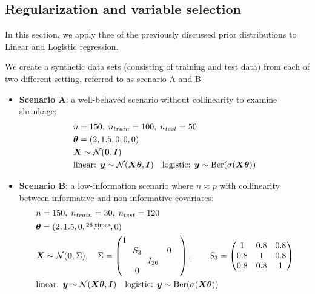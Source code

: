 \subsection{Regularization and variable selection}

In this section, we apply thee of the previously discussed prior distributions to Linear and Logistic regression.

We create a synthetic data sets (consisting of training and test data) from each of two different setting, referred to as scenario A and B.

\begin{itemize}
    \item \textbf{Scenario A}: a well-behaved scenario without collinearity to examine shrinkage:
    \begin{equation*}
        \begin{aligned}
            &n = 150,\; n_{train} = 100,\;n_{test} = 50 \\
            &\bm{\theta} = (2, 1.5, 0, 0, 0) \\
            &\bm{X} \sim \mathcal{N}(\bm{0}, \bm{I}) \\
            &\text{linear: } \bm{y} \sim \mathcal{N}(\bm{X} \bm{\theta},\bm{I})\quad \text{logistic: } \bm{y} \sim \text{Ber}(\sigma(\bm{X} \bm{\theta}))
        \end{aligned}
    \end{equation*}
    \item \textbf{Scenario B}: a low-information scenario where $n \approx p$ with collinearity between informative and non-informative covariates:
    \begin{equation*}
        \begin{aligned}
            &n = 150,\; n_{train} = 30,\;n_{test} = 120 \\
            &\bm{\theta} = (2, 1.5, 0, \overset{26\; \text{times}}{\dots}, 0) \\
            &\bm{X} \sim \mathcal{N}(\bm{0}, \Sigma), \quad \Sigma =
                    \begin{pmatrix}
                    1 &        &         &        &        \\
                        & \!\!S_3\!\! &        & 0      &        \\
                        &        & I_{26} &        &        \\
                        & 0      &        &        &        \\
                    \end{pmatrix},
                    \qquad
                    S_3 = 
                    \begin{pmatrix}
                    1   & 0.8 & 0.8\\
                    0.8 & 1   & 0.8\\
                    0.8 & 0.8 & 1
                    \end{pmatrix}\\
            &\text{linear: } \bm{y} \sim \mathcal{N}(\bm{X} \bm{\theta}, \bm{I})\quad \text{logistic: } \bm{y} \sim \text{Ber}(\sigma(\bm{X} \bm{\theta}))
        \end{aligned}
    \end{equation*}
\end{itemize}

